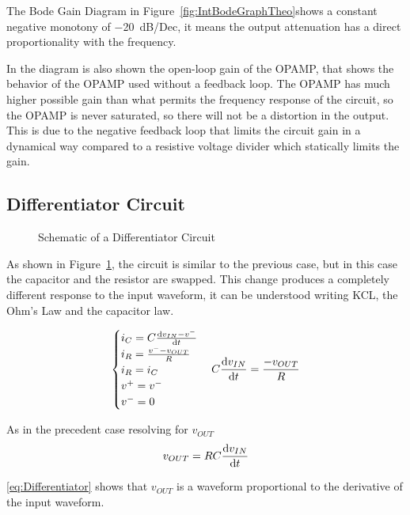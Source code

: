 \documentclass[a4paper, twocolumn]{article}
\begin{document}
The Bode Gain Diagram in Figure~\ref{fig:IntBodeGraphTheo}shows a constant negative monotony of \SI{-20}{\deci\bel/Dec}, it means the output attenuation has a direct proportionality with the frequency.

In the diagram is also shown the open-loop gain of the OPAMP, that shows the behavior of the OPAMP used without a feedback loop. The OPAMP has much higher possible gain than what permits the frequency response of the circuit, so the OPAMP is never saturated, so there will not be a distortion in the output. This is due to the negative feedback loop that limits the circuit gain in a dynamical way compared to a resistive voltage divider which statically limits the gain.

\subsection{Differentiator Circuit} 
\label{sec:diff}

\begin{figure}
    \centering
    \def \svgwidht{\columnwidth}
    
    \caption{Schematic of a Differentiator Circuit}
    \label{fig:DifferScheme}
\end{figure}

As shown in Figure~\ref{fig:DifferScheme}, the circuit is similar to the previous case, but in this case the capacitor and the resistor are swapped. This change produces a completely different response to the input waveform, it can be understood writing KCL, the Ohm's Law and the capacitor law.

\begin{gather*}
    \begin{cases}
        i_C = C\dv{v_{IN}-v^-}{t}\\
        i_R = \frac{v^--v_{OUT}}{R}\\
        i_R = i_C\\
        v^+=v^-\\
        v^-=0
    \end{cases}
    C\dv{v_{IN}}{t}=\frac{-v_{OUT}}{R}
\end{gather*}

As in the precedent case resolving for $v_{OUT}$
\begin{equation}
    \label{eq:Differentiator}
    v_{OUT}=RC\dv{v_{IN}}{t}
\end{equation}

\eqref{eq:Differentiator} shows that $v_{OUT}$ is a waveform proportional to the derivative of the input waveform. 
\end{document}
